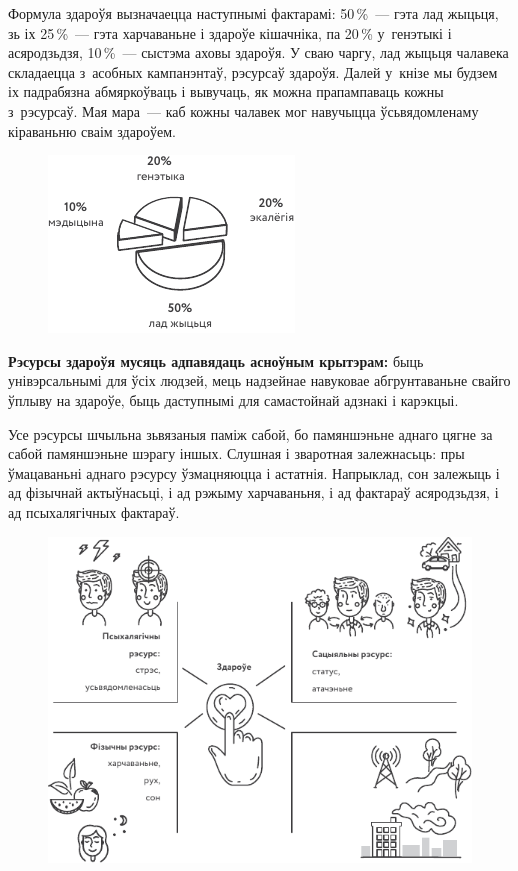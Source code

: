 Формула здароўя вызначаецца наступнымі фактарамі: 50\,\%~--- гэта лад жыцьця, зь іх 25\,\%~--- гэта харчаваньне і здароўе кішачніка, па 20\,\% у~генэтыкі і асяродзьдзя, 10\,\%~--- сыстэма аховы здароўя. У сваю чаргу, лад жыцьця чалавека складаецца з~асобных кампанэнтаў, рэсурсаў здароўя. Далей у~кнізе мы будзем іх падрабязна абмяркоўваць і вывучаць, як можна прапампаваць кожны з~рэсурсаў. Мая мара~--- каб кожны чалавек мог навучыцца ўсьвядомленаму кіраваньню сваім здароўем.

\begin{figure}[htb!]
  \centering
  \includegraphics[scale=1.5]{willpower/ch1/5.pdf}
\end{figure}

\textbf{Рэсурсы здароўя мусяць адпавядаць асноўным крытэрам:} быць унівэрсальнымі для ўсіх людзей, мець надзейнае навуковае абгрунтаваньне свайго ўплыву на здароўе, быць даступнымі для самастойнай адзнакі і карэкцыі.

Усе рэсурсы шчыльна зьвязаныя паміж сабой, бо памяншэньне аднаго цягне за сабой памяншэньне шэрагу іншых. Слушная і зваротная залежнасьць: пры ўмацаваньні аднаго рэсурсу ўзмацняюцца і астатнія. Напрыклад, сон залежыць і ад фізычнай актыўнасьці, і ад рэжыму харчаваньня, і ад фактараў асяродзьдзя, і ад псыхалягічных фактараў.

\begin{figure}[thb!]
  \centering
  \includegraphics[scale=1.5]{willpower/ch1/6.pdf}
\end{figure}

